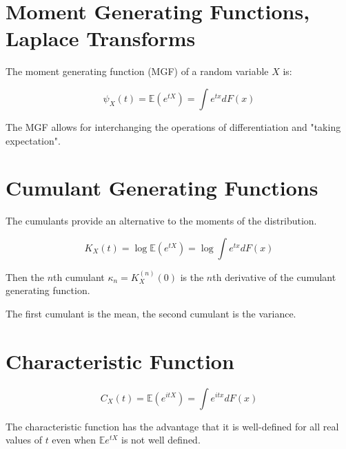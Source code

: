 \section{Moment Generating Functions, Laplace Transforms}

The moment generating function (MGF) of a random variable $X$ is:

\begin{equation}
\psi_X(t) = \mathbb{E}(e^{tX}) = \int e^{tx}dF(x)
\end{equation}

The MGF allows for interchanging the operations of differentiation and "taking expectation".

\section{Cumulant Generating Functions}
The cumulants provide an alternative to the moments of the distribution.

\begin{equation}
K_X(t) = \log\mathbb{E}(e^{tX}) = \log\int e^{tx}dF(x)
\end{equation}

Then the $n$th cumulant $\kappa_n = K_X^{(n)}(0)$ is the $n$th derivative of the cumulant generating function.

The first cumulant is the mean, the second cumulant is the variance. 

\section{Characteristic Function}

\begin{equation}
C_X(t) = \mathbb{E}(e^{itX}) = \int e^{itx}dF(x)
\end{equation}

The characteristic function has the advantage that it is well-defined for all real values of $t$ even when $\mathbb{E}e^{tX}$ is not well defined.



